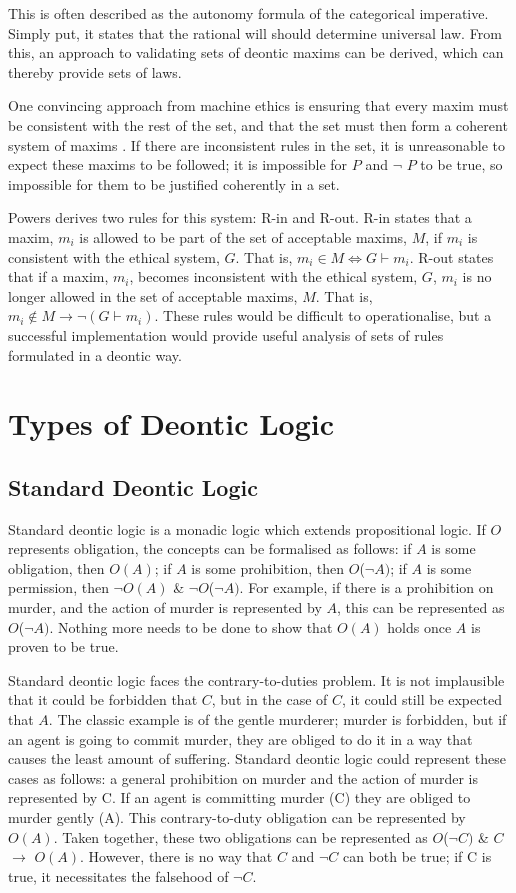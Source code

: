 \documentclass{l4proj}
\begin{document}
This is often described as the autonomy formula of the categorical imperative. Simply put, it states that the rational will should determine universal law. From this, an approach to validating sets of deontic maxims can be derived, which can thereby provide sets of laws. 

One convincing approach from machine ethics is ensuring that every maxim must be consistent with the rest of the set, and that the set must then form a coherent system of maxims \cite{Powers}. If there are inconsistent rules in the set, it is unreasonable to expect these maxims to be followed; it is impossible for $P$ and \( \neg \) $P$ to be true, so impossible for them to be justified coherently in a set. 

Powers derives two rules for this system: R-in and R-out. R-in states that a maxim, $m_i$ is allowed to be part of the set of acceptable maxims, $M$, if $m_i$ is consistent with the ethical system, $G$. That is, $m_i \in M \iff G \vdash m_i $. R-out states that if a maxim, $m_i$, becomes inconsistent with the ethical system, $G$, $m_i$ is no longer allowed in the set of acceptable maxims, $M$. That is, $m_i \notin M \rightarrow \neg(G \vdash m_i)$. These rules would be difficult to operationalise, but a successful implementation would provide useful analysis of sets of rules formulated in a deontic way. 

\section{Types of Deontic Logic}

\subsection{Standard Deontic Logic}
Standard deontic logic is a monadic logic which extends propositional logic. If $O$ represents obligation, the concepts can be formalised as follows: if $A$ is some obligation, then $O(A)$; if $A$ is some prohibition, then $O$(\( \neg \)$A)$; if $A$ is some permission, then \( \neg \)$O(A)$ \& \( \neg \)$O$(\( \neg \)$A)$. For example, if there is a prohibition on murder, and the action of murder is represented by $A$, this can be represented as $O$(\( \neg \)$A)$. Nothing more needs to be done to show that $O(A)$ holds once $A$ is proven to be true. 

Standard deontic logic faces the contrary-to-duties problem. It is not implausible that it could be forbidden that $C$, but in the case of $C$, it could still be expected that $A$. The classic example is of the gentle murderer; murder is forbidden, but if an agent is going to commit murder, they are obliged to do it in a way that causes the least amount of suffering. Standard deontic logic could represent these cases as follows: a general prohibition on murder and the action of murder is represented by C. If an agent is committing murder (C) they are obliged to murder gently (A). This contrary-to-duty obligation can be represented by $O(A)$. Taken together, these two obligations can be represented as $O$(\( \neg \)$C)$ \& $C$ \( \to \) $O(A)$. However, there is no way that $C$ and \( \neg \)$C$ can both be true; if C is true, it necessitates the falsehood of $\neg C$. 
\end{document}

